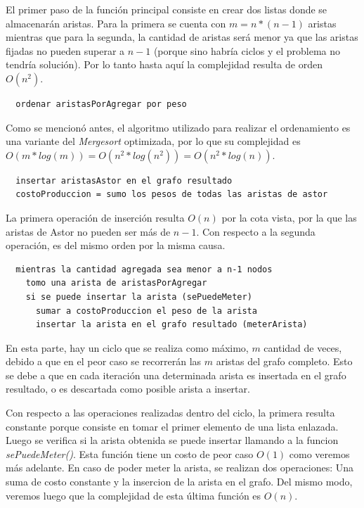 \documentclass[a4paper,11pt] {article}
\begin{document}
El primer paso de la función principal consiste en crear dos listas donde se almacenarán aristas. Para la primera se cuenta con $m = n*(n-1)$ aristas mientras que para la segunda, la cantidad de aristas será menor ya que las aristas fijadas no pueden superar a $n-1$ (porque sino habría ciclos y el problema no tendría solución). Por lo tanto hasta aquí la complejidad resulta de orden $O(n^2)$.

\begin{verbatim}
  ordenar aristasPorAgregar por peso
\end{verbatim}

Como se mencionó antes, el algoritmo utilizado para realizar el ordenamiento es una variante del \textit{Mergesort} optimizada, por lo que su complejidad es $O(m*log(m)) = O(n^2*log(n^2)) = O(n^2*log(n))$.

\begin{verbatim}
  insertar aristasAstor en el grafo resultado
  costoProduccion = sumo los pesos de todas las aristas de astor
\end{verbatim}

La primera operación de inserción resulta $O(n)$ por la cota vista, por la que las aristas de Astor no pueden ser más de $n-1$. Con respecto a la segunda operación, es del mismo orden por la misma causa.

\begin{verbatim}
  mientras la cantidad agregada sea menor a n-1 nodos
    tomo una arista de aristasPorAgregar
    si se puede insertar la arista (sePuedeMeter)
      sumar a costoProduccion el peso de la arista
      insertar la arista en el grafo resultado (meterArista)
\end{verbatim}

En esta parte, hay un ciclo que se realiza como máximo, $m$ cantidad de veces, debido a que en el peor caso se recorrerán las $m$ aristas del grafo completo. Esto se debe a que en cada iteración una determinada arista es insertada en el grafo resultado, o es descartada como posible arista a insertar.

Con respecto a las operaciones realizadas dentro del ciclo, la primera resulta constante porque consiste en tomar el primer elemento de una lista enlazada. Luego se verifica si la arista obtenida se puede insertar llamando a la funcion \textit{sePuedeMeter()}. Esta función tiene un costo de peor caso $O(1)$ como veremos más adelante. En caso de poder meter la arista, se realizan dos operaciones: Una suma de costo constante y la insercion de la arista en el grafo. Del mismo modo, veremos luego que la complejidad de esta última función es $O(n)$.
\end{document}

